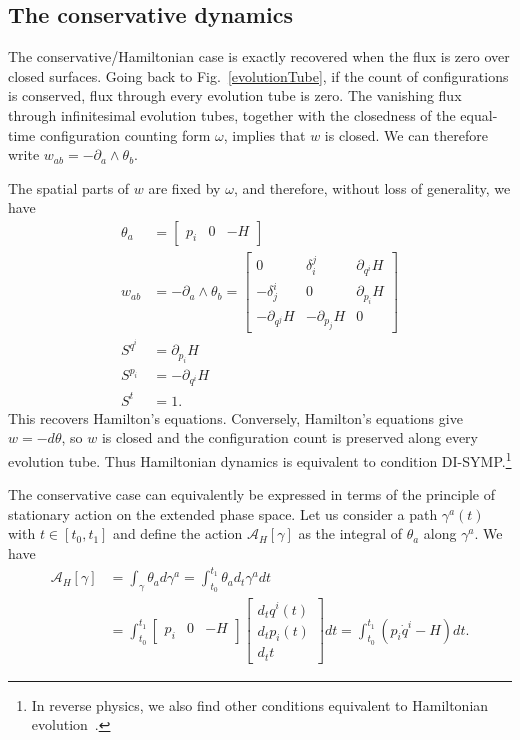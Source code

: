 \documentclass[nofootinbib,aps,pre]{revtex4-2}
\begin{document}
\subsection{The conservative dynamics}

The conservative/Hamiltonian case is exactly recovered when the flux is zero over closed surfaces. Going back to Fig.~\ref{evolutionTube}, if the count of configurations is conserved, flux through every evolution tube is zero. The vanishing flux through infinitesimal evolution tubes, together with the closedness of the equal-time configuration counting form $\omega$, implies that $w$ is closed. We can therefore write $w_{ab} = - \partial_a \wedge \theta_b$.

The spatial parts of $w$ are fixed by $\omega$, and therefore, without loss of generality, we have
\begin{equation}
	\begin{aligned}
		\theta_a &= \begin{bmatrix}
			p_i & 0 & -H
		\end{bmatrix} \\
		w_{ab} &= - \partial_a \wedge \theta_b = \begin{bmatrix}
			0 & \delta_i^j & \partial_{q^i} H \\
			-\delta_j^i & 0 & \partial_{p_i} H \\
			- \partial_{q^j} H & -\partial_{p_j} H & 0
		\end{bmatrix} \\
		S^{q^i} &= \partial_{p_i} H \\
		S^{p_i} &= - \partial_{q^i} H \\
		S^t &= 1.
	\end{aligned}
\end{equation}
This recovers Hamilton's equations. Conversely, Hamilton’s equations give $w=-d\theta$, so $w$ is closed and the configuration count is preserved along every evolution tube. Thus Hamiltonian dynamics is equivalent to condition DI-SYMP.\footnote{In reverse physics, we also find other conditions equivalent to Hamiltonian evolution~\cite{aop-book}.}

The conservative case can equivalently be expressed in terms of the principle of stationary action on the extended phase space. Let us consider a path $\gamma^a(t)$ with $t \in [t_0, t_1]$ and define the action $\mathcal{A}_H[\gamma]$ as the integral of $\theta_a$ along $\gamma^a$. We have
\begin{equation}
    \begin{aligned}
        \mathcal{A}_H[\gamma] &= \int_\gamma \theta_a d\gamma^a = \int_{t_0}^{t_1} \theta_a d_t \gamma^a dt \\
        &= \int_{t_0}^{t_1} \begin{bmatrix}
            p_i & 0 & -H
        \end{bmatrix} \begin{bmatrix}
            d_t q^i(t) \\ d_t p_i(t) \\ d_t t 
        \end{bmatrix} dt
        = \int_{t_0}^{t_1} ( p_i \dot q^i - H) dt.
    \end{aligned}
\end{equation}
\end{document}
